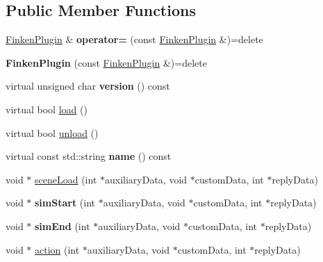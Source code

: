 \subsection*{Public Member Functions}
\begin{DoxyCompactItemize}
\item 
\hyperlink{classFinkenPlugin}{Finken\+Plugin} \& {\bfseries operator=} (const \hyperlink{classFinkenPlugin}{Finken\+Plugin} \&)=delete\hypertarget{classFinkenPlugin_a3ebea1e19535491b5db16c7f43df8e79}{}\label{classFinkenPlugin_a3ebea1e19535491b5db16c7f43df8e79}

\item 
{\bfseries Finken\+Plugin} (const \hyperlink{classFinkenPlugin}{Finken\+Plugin} \&)=delete\hypertarget{classFinkenPlugin_a5f4bc33c0d0bb05ca4f78090c7a2fda9}{}\label{classFinkenPlugin_a5f4bc33c0d0bb05ca4f78090c7a2fda9}

\item 
virtual unsigned char {\bfseries version} () const \hypertarget{classFinkenPlugin_a046a229dfbc8185bac916ad2e49ec865}{}\label{classFinkenPlugin_a046a229dfbc8185bac916ad2e49ec865}

\item 
virtual bool \hyperlink{classFinkenPlugin_afbe5d82635afe4b0c407de4724e8ee14}{load} ()
\item 
virtual bool \hyperlink{classFinkenPlugin_ae9c984b362c6a828206fa6201291851c}{unload} ()
\item 
virtual const std\+::string {\bfseries name} () const \hypertarget{classFinkenPlugin_a1a7d0d65f88654c37b282e07d36417ec}{}\label{classFinkenPlugin_a1a7d0d65f88654c37b282e07d36417ec}

\item 
void $\ast$ \hyperlink{classFinkenPlugin_a82c0cd5fa1b9fdb5f5a625458a9b545b}{scene\+Load} (int $\ast$auxiliary\+Data, void $\ast$custom\+Data, int $\ast$reply\+Data)
\item 
void $\ast$ {\bfseries sim\+Start} (int $\ast$auxiliary\+Data, void $\ast$custom\+Data, int $\ast$reply\+Data)\hypertarget{classFinkenPlugin_a142f62305fcc926bb6cf86744edbb82b}{}\label{classFinkenPlugin_a142f62305fcc926bb6cf86744edbb82b}

\item 
void $\ast$ {\bfseries sim\+End} (int $\ast$auxiliary\+Data, void $\ast$custom\+Data, int $\ast$reply\+Data)\hypertarget{classFinkenPlugin_aec5f5cf14ca485055ccc321a716780a4}{}\label{classFinkenPlugin_aec5f5cf14ca485055ccc321a716780a4}

\item 
void $\ast$ \hyperlink{classFinkenPlugin_a00d8bcdd7c4b28eb76712b84f512b12b}{action} (int $\ast$auxiliary\+Data, void $\ast$custom\+Data, int $\ast$reply\+Data)
\end{DoxyCompactItemize}
